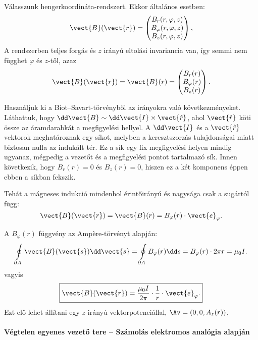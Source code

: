     Válasszunk hengerkoordináta-rendszert.
   Ekkor általános esetben:
    \[
     \vect{B}(\vect{r})=\begin{pmatrix}
                         B_r(r,\varphi,z) \\
                         B_\varphi(r,\varphi,z) \\
                         B_z(r,\varphi,z) 
                        \end{pmatrix},
    \]
    A rendszerben teljes forgás és $z$ irányú eltolási invariancia van, így semmi nem függhet $\varphi$ és $z$-től, azaz
    \[
     \vect{B}(\vect{r})=\vect{B}(r)=\begin{pmatrix}
                         B_r(r) \\
                         B_\varphi(r) \\
                         B_z(r) 
                        \end{pmatrix}.
    \]
    
    Használjuk ki a Biot--Savart-törvényből az irányokra való következményeket.
   Láthattuk, hogy $\dd \vect{B}\sim \dd \vect{I}\times \vect{\hat{r}}$, ahol $\vect{\hat{r}}$ köti össze az áramdarabkát a megfigyelési hellyel.
   A  $\dd \vect{I}$ és a $\vect{\hat{r}}$ vektorok meghatároznak egy síkot, melyben a keresztszorzás tulajdonságai miatt biztosan nulla az indukált tér.
   Ez a sík egy fix megfigyelési helyen mindig ugyanaz, mégpedig a vezetőt és a megfigyelési pontot tartalmazó sík.
   Innen következik, hogy $B_r(r)=0$ és $B_z(r)=0$, hiszen ez a két komponens éppen ebben a síkban fekszik. 
    
    Tehát a mágneses indukció mindenhol érintőirányú és nagysága csak a sugártól függ:
    \[
     \vect{B}(\vect{r})=\vect{B}(r)=B_\varphi(r)\cdot\vect{e}_\varphi.
    \]
    
    A $B_\varphi(r)$ függvény az Amp\`ere-törvényt alapján: 
    \[
     \oint\limits_{\partial A}\vect{B}(\vect{s})\dd \vect{s}=\oint\limits_{\partial A}B_\varphi(r)\dd s=B_\varphi(r)\cdot 2\pi r=\mu_0 I.
    \]
    vagyis 
    \[
     \boxed{\vect{B}(\vect{r})=\frac{\mu_0 I}{2\pi}\cdot\frac{1}{r}\cdot\vect{e}_\varphi.}
    \]
    Ezt elő lehet állítani egy $z$ irányú vektorpotenciállal, $\Av=(0,0,A_z(r))$,
    
   \paragraph{Végtelen egyenes vezető tere -- Számolás elektromos analógia alapján}
    
